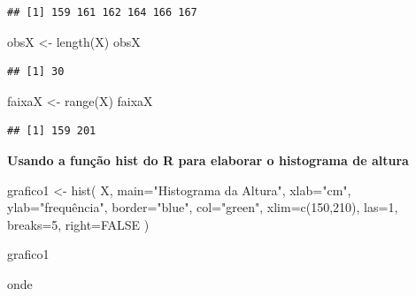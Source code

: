 \documentclass[
]{book}
\newenvironment{Shaded}{\begin{snugshade}}{\end{snugshade}}
\newcommand{\AttributeTok}[1]{\textcolor[rgb]{0.77,0.63,0.00}{#1}}
\newcommand{\ConstantTok}[1]{\textcolor[rgb]{0.00,0.00,0.00}{#1}}
\newcommand{\DecValTok}[1]{\textcolor[rgb]{0.00,0.00,0.81}{#1}}
\newcommand{\FunctionTok}[1]{\textcolor[rgb]{0.00,0.00,0.00}{#1}}
\newcommand{\NormalTok}[1]{#1}
\newcommand{\OtherTok}[1]{\textcolor[rgb]{0.56,0.35,0.01}{#1}}
\newcommand{\StringTok}[1]{\textcolor[rgb]{0.31,0.60,0.02}{#1}}
\begin{document}
\begin{verbatim}
## [1] 159 161 162 164 166 167
\end{verbatim}

\begin{Shaded}
\begin{Highlighting}[]
\NormalTok{obsX }\OtherTok{\textless{}{-}} \FunctionTok{length}\NormalTok{(X)}
\NormalTok{obsX}
\end{Highlighting}
\end{Shaded}

\begin{verbatim}
## [1] 30
\end{verbatim}

\begin{Shaded}
\begin{Highlighting}[]
\NormalTok{faixaX }\OtherTok{\textless{}{-}} \FunctionTok{range}\NormalTok{(X)}
\NormalTok{faixaX}
\end{Highlighting}
\end{Shaded}

\begin{verbatim}
## [1] 159 201
\end{verbatim}

\textbf{Usando a função hist do R para elaborar o histograma de altura}

\begin{Shaded}
\begin{Highlighting}[]
\NormalTok{grafico1 }\OtherTok{\textless{}{-}} \FunctionTok{hist}\NormalTok{( }
\NormalTok{                  X, }
                  \AttributeTok{main=}\StringTok{"Histograma da Altura"}\NormalTok{, }
                  \AttributeTok{xlab=}\StringTok{"cm"}\NormalTok{, }
                  \AttributeTok{ylab=}\StringTok{"frequência"}\NormalTok{, }
                  \AttributeTok{border=}\StringTok{"blue"}\NormalTok{, }
                  \AttributeTok{col=}\StringTok{"green"}\NormalTok{, }
                  \AttributeTok{xlim=}\FunctionTok{c}\NormalTok{(}\DecValTok{150}\NormalTok{,}\DecValTok{210}\NormalTok{), }
                  \AttributeTok{las=}\DecValTok{1}\NormalTok{, }
                  \AttributeTok{breaks=}\DecValTok{5}\NormalTok{, }
                  \AttributeTok{right=}\ConstantTok{FALSE} 
\NormalTok{                ) }

\NormalTok{grafico1}
\end{Highlighting}
\end{Shaded}

onde
\end{document}
